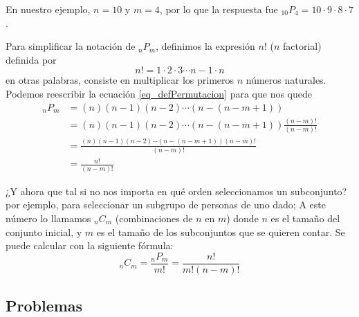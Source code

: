 \documentclass[spanish]{report}
\newcommand{\comb}[2]{ {}_{#1}C_{#2}}
\newcommand{\perm}[2]{ {}_{#1}P_{#2}}
\begin{document}
En nuestro ejemplo, $n=10$ y $m=4$, por lo que la respuesta fue $\perm{10}{4} = 10 \cdotp 9 \cdotp 8 \cdotp 7$.

Para simplificar la notación de $\perm{n}{m}$, definimos la expresión $n!$ ($n$ factorial) definida por \[ n! = 1 \cdotp 2 \cdotp 3 \cdots n-1 \cdotp n\]
en otras palabras, consiste en multiplicar los primeros $n$ números naturales.
Podemos reescribir la ecuación \ref{eq_defPermutacion} para que nos quede
\begin{align*}
\perm{n}{m} &= (n) (n-1) (n-2) \cdots (n-(n-m+1)) \\
	&= (n) (n-1) (n-2) \cdots (n-(n-m+1)) \frac{(n-m)!}{(n-m)!}\\
	&= \frac{(n) (n-1) (n-2) \cdots (n-(n-m+1)) (n-m)!}{(n-m)!}\\
	&= \frac{n!}{(n-m)!}
\end{align*}

¿Y ahora que tal si no nos importa en qué orden seleccionamos un subconjunto? por ejemplo, para seleccionar un subgrupo de personas de uno dado; %
A este número lo llamamos $\comb{n}{m}$ (combinaciones de $n$ en $m$) donde $n$ es el tamaño del conjunto inicial, y $m$ es el tamaño de los subconjuntos que se quieren contar.
Se puede calcular con la siguiente fórmula: \[\comb{n}{m} = \frac{\perm{n}{m}}{m!} = \frac{n!}{m!(n-m)!} \]

\subsection{Problemas}
\end{document}
